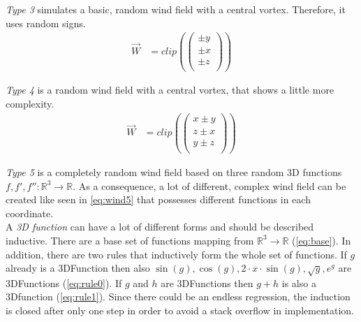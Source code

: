 \emph{Type 3} simulates a basic, random wind field with a central vortex. Therefore, it uses random signs.
\begin{align}
	\overrightarrow{W} &= clip(\left(
	\begin{array}{c}
		\pm y\\
		\pm x\\
		\pm z\\
	\end{array}
	\right))
\end{align}
\newline

\emph{Type 4} is a random wind field with a central vortex, that shows a little more complexity.
\begin{align}
	\overrightarrow{W} &= clip(\left(
	\begin{array}{c}
		x \pm y\\
		z \pm x\\
		y \pm z\\
	\end{array}
	\right))
\end{align}
\newline

\emph{Type 5} is a completely random wind field based on three random 3D functions $f, f', f'': \mathbb{R}^3 \to \mathbb{R}$. As a consequence, a lot of different, complex wind field can be created like seen in \cref{eq:wind5} that possesses different functions in each coordinate.\\

A \emph{3D function} can have a lot of different forms and should be described inductive. There are a base set of functions mapping from $\mathbb{R}^3 \to \mathbb{R}$ (\cref{eq:base}). In addition, there are two rules that inductively form the whole set of functions. If $g$ already is a 3DFunction then also $\sin(g), \cos(g), 2 \cdot x \cdot \sin(g), \sqrt{g}, e^g$ are 3DFunctions (\cref{eq:rule0}). If $g$ and $h$ are 3DFunctions then $g+h$ is also a 3Dfunction (\cref{eq:rule1}). Since there could be an endless regression, the induction is closed after only one step in order to avoid a stack overflow in implementation. 

